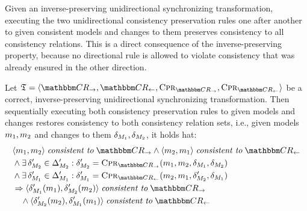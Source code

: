 Given an inverse-preserving unidirectional synchronizing transformation, executing the two unidirectional consistency preservation rules one after another to given consistent models and changes to them preserves consistency to all consistency relations.
This is a direct consequence of the inverse-preserving property, because no directional rule is allowed to violate consistency that was already ensured in the other direction.

\begin{theorem}
    Let $\transformation{T} = \tupled{\consistencyrelationset{CR}_{\rightarrow}, \consistencyrelationset{CR}_{\leftarrow}, \consistencypreservationrule{\consistencyrelationset{CR}_{\rightarrow}}, \consistencypreservationrule{\consistencyrelationset{CR}_{\leftarrow}}}$ be a correct, inverse-preserving unidirectional synchronizing transformation.
    Then sequentially executing both consistency preservation rules to given models and changes restores consistency to both consistency relation sets, i.e., given models $m_{1}, m_{2}$ and changes to them $\delta_{M_{1}}, \delta_{M_{2}}$, it holds hat:
    \begin{align*}
        &
        \tupled{\model{m}{1}, \model{m}{2}} \consistenttomath \consistencyrelationset{CR}_{\rightarrow}
        \land \tupled{\model{m}{2}, \model{m}{1}} \consistenttomath \consistencyrelationset{CR}_{\leftarrow}\\
        &
        \land \exists \change{\metamodel{M}{2}}' \in \changeuniverse{\metamodel{M}{2}}' : 
        \change{\metamodel{M}{2}}' = \consistencypreservationrule{\consistencyrelationset{CR}_{\rightarrow}}(\model{m}{1}, \model{m}{2}, \change{\metamodel{M}{1}}, \change{\metamodel{M}{2}}) \\
        &
        \land \exists \change{\metamodel{M}{1}}' \in \changeuniverse{\metamodel{M}{1}}' :
        \change{\metamodel{M}{1}}' = \consistencypreservationrule{\consistencyrelationset{CR}_{\leftarrow}}(\model{m}{2}, \model{m}{1}, \change{\metamodel{M}{2}}', \change{\metamodel{M}{1}}) \\
        &
        \Rightarrow \tupled{\change{\metamodel{M}{1}}'(\model{m}{1}), \change{\metamodel{M}{2}}'(\model{m}{2})}\consistenttomath \consistencyrelationset{CR}_{\rightarrow}  \\
        & \formulaskip
        \land \tupled{\change{\metamodel{M}{2}}'(\model{m}{2}), \change{\metamodel{M}{1}}'(\model{m}{1})} \consistenttomath \consistencyrelationset{CR}_{\leftarrow}
    \end{align*}
\end{theorem}
